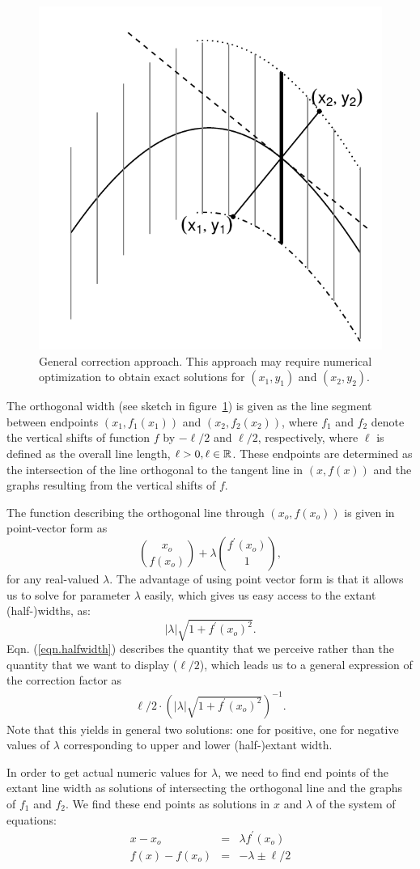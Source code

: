 \documentclass[11pt]{isuthesis}\usepackage[]{graphicx}\usepackage[]{color}
\begin{document}
\begin{figure}
\centering
\includegraphics[keepaspectratio=TRUE,width=.33\textwidth]{fig-generalcorrectioncartoon3}
\caption[General correction approach]{ General correction approach. This approach may require numerical optimization to obtain exact solutions for $(x_1, y_1)$ and $(x_2, y_2)$.}\label{fig:GeneralCorrection}
\end{figure}

The orthogonal width (see sketch in figure~\ref{fig:GeneralCorrection}) is given as the line segment between endpoints $(x_1, f_1(x_1))$ and $(x_2, f_2(x_2))$, where $f_1$ and $f_2$ denote the vertical shifts of function $f$ by $-\ell/2$ and $\ell/2$, respectively, where $\ell$ is defined as the overall line length, $\ell > 0, \ell \in \mathbb{R}$.
These endpoints are determined as the intersection of the line  orthogonal to the tangent line in $(x, f(x))$ and the graphs resulting from the vertical shifts of $f$.

The function describing the orthogonal line through $(x_o, f(x_o))$ is given in point-vector form as 
\[
{x_o \choose f(x_o)} + \lambda {f^\prime(x_o) \choose 1}, 
\]
for any real-valued $\lambda$.
The advantage of using point vector form is that it allows us to solve for parameter $\lambda$ easily, which gives us easy access to the extant (half-)widths,  as: 
\begin{equation}\label{eqn.halfwidth}
|\lambda| \sqrt{1 + f^\prime(x_o)^2}.
\end{equation}
Eqn. (\ref{eqn.halfwidth}) describes the quantity that we perceive rather than the quantity that we want to display ($\ell/2$), which leads us to a general expression of the correction factor as
\begin{eqnarray*}
 \ell/2 \cdot \left(|\lambda| \sqrt{1 + f^\prime(x_o)^2}\right)^{-1}.
\end{eqnarray*}
Note that this yields in general two solutions: one for positive, one for negative values of $\lambda$ corresponding to upper and lower (half-)extant width.

In order to get  actual numeric values for $\lambda$, we need to find end points of the extant line width as solutions of intersecting the orthogonal line and  the graphs of $f_1$ and $f_2$. We find these end points  as solutions in $x$ and $\lambda$ of the system of equations:
\begin{eqnarray}\label{eqn.general}
 x - x_o &=& \lambda f^\prime(x_o)\\ \label{eqn.general.2}
 f(x) - f(x_o) &=& -\lambda \pm \ell/2
\end{eqnarray}
\end{document}
